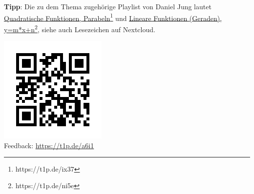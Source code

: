 \documentclass[a4paper,12pt]{exam}
\begin{document}
\begin{questions}
\begin{solution}
	\end{solution}
















\end{questions}

\par \textbf{Tipp}: Die zu dem Thema zugehörige Playlist von Daniel Jung lautet \href{https://t1p.de/ix37}{Quadratische Funktionen, Parabeln\footnote{\url{https://t1p.de/ix37}}} und \href{https://t1p.de/ni5e}{Lineare Funktionen (Geraden), y=m*x+n\footnote{\url{https://t1p.de/ni5e}}}, siehe auch Lesezeichen auf Nextcloud.
\vspace{1cm}

\includegraphics[scale=0.4]{qr-code-t1p-de-a6i1}\\
Feedback: \href{https://t1p.de/a6i1}{https://t1p.de/a6i1}
\end{document}
